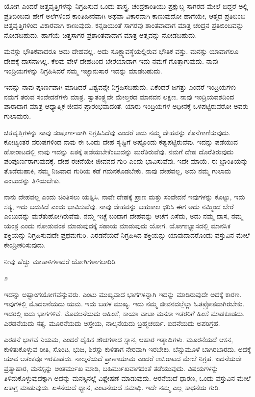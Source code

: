 ಯೋಗ ಎಂದರೆ ಚಿತ್ತವೃತ್ತಿಗಳನ್ನು ನಿಗ್ರಹಿಸುವ ಒಂದು ಶಾಸ್ತ್ರ. ಚಂದ್ರಕಾಂತಿಯು ಪ್ರಕ್ಷುಬ್ಧ ಸಾಗರದ ಮೇಲೆ ಬಿದ್ದರೆ ಅಲ್ಲಿ ಪ್ರತಿಬಿಂಬವು ಹೇಗೆ ಅಲೆಗಳಿಂದ ಕಾಂತಿಹೀನವಾಗಿ ಅಥವಾ ವಿಕಾರವಾಗಿ ಕಾಣುವುದೋ ಹಾಗೆಯೇ, ಆತ್ಮದ ಪ್ರತಿಬಿಂಬ ಚಿತ್ತವೃತ್ತಿಗಳಿಂದ ವಿಕಾರವಾಗಿ ಕಾಣುವುದು. ಕನ್ನಡಿಯಂತೆ ಸಾಗರವು ಶಾಂತವಾದಾಗ ಮಾತ್ರ ಚಂದ್ರನ ಪ್ರತಿಬಿಂಬವನ್ನು ನೋಡಬಹುದು. ಹಾಗೆಯೆ ಚಿತ್ತಸಾಗರ ಪ್ರಶಾಂತವಾದಾಗ ಮಾತ್ರ ಆತ್ಮವನ್ನು ನೋಡಬಹುದು.

\newpage

ಮನಸ್ಸು ಭೌತಿಕವಾದರೂ ಅದು ದೇಹವಲ್ಲ. ಅದು ಸೂಕ್ಷ್ಮಾವಸ್ಥೆಯಲ್ಲಿರುವ ಭೌತಿಕ ವಸ್ತು. ಮನಸ್ಸು ಯಾವಾಗಲೂ ದೇಹಕ್ಕೆ ದಾಸನಾಗಿಲ್ಲ. ಕೆಲವು ವೇಳೆ ದೇಹದಿಂದ ಬೇರೆಯಾದಾಗ ಇದು ನಮಗೆ ಗೊತ್ತಾಗುವುದು. ನಾವು ಇಂದ್ರಿಯಗಳನ್ನು ನಿಗ್ರಹಿಸಿದರೆ ನಮ್ಮ ಇಚ್ಛಾನುಸಾರ ಇದನ್ನು ಮಾಡಬಹುದು.

ಇದನ್ನು ನಾವು ಪೂರ್ಣವಾಗಿ ಮಾಡಿದರೆ ವಿಶ್ವವನ್ನೇ ನಿಗ್ರಹಿಸಬಹುದು. ಏಕೆಂದರೆ ಜಗತ್ತು ಎಂದರೆ ಇಂದ್ರಿಯಗಳು ನಮಗೆ ತರುವ ಸಂವೇದನೆಗಳು ಮಾತ್ರ. ಸ್ವಾತಂತ್ರ್ಯವೇ ಮೇಲ್ತರದ ಮಾನವನ ಲಕ್ಷಣ. ನಾವು ಇಂದ್ರಿಯವಶದಿಂದ ಪಾರಾದಾಗ ಮಾತ್ರ ಆಧ್ಯಾತ್ಮಿಕ ಜೀವನ ಪ್ರಾರಂಭವಾದಂತೆ. ಯಾರು ಇಂದ್ರಿಯಗಳ ಅಧೀನಕ್ಕೆ ಒಳಪಟ್ಟಿರುವರೋ ಅವರು ಗುಲಾಮರು.

ಚಿತ್ತವೃತ್ತಿಗಳನ್ನು ನಾವು ಸಂಪೂರ್ಣವಾಗಿ ನಿಗ್ರಹಿಸಿದೆವು ಎಂದರೆ ಅದು ನಮ್ಮ ದೇಹವನ್ನು ಕೊನೆಗಾಣಿಸುವುದು. ಕೋಟ್ಯಂತರ ವರುಷಗಳಿಂದ ನಾವು ಈ ಒಂದು ದೇಹ ಸೃಷ್ಟಿಗೆ ಅಷ್ಟೊಂದು ಕಷ್ಟಪಟ್ಟಿರುವೆವು. ಇದನ್ನು ಪಡೆಯುವ ಹೋರಾಟದಲ್ಲಿ ನಾವು ಇದನ್ನು ಏತಕ್ಕೆ ಪಡೆಯಬೇಕೆಂಬುದನ್ನು ಮರೆತಿರುವೆವು. ನಮಗೆ ದೇಹ ದೊರೆತಿರುವುದು ಪರಿಪೂರ್ಣರಾಗುವುದಕ್ಕೆ. ದೇಹ ರಚನೆಯೇ ಜೀವನದ ಗುರಿ ಎಂದು ಭಾವಿಸುವೆವು. ಇದೇ ಮಾಯೆ. ಈ ಭ್ರಾಂತಿಯನ್ನು ತೊಡೆದುಹಾಕಿ, ನಮ್ಮ ನಿಜವಾದ ಗುರಿಯ ಕಡೆ ಗಮನಕೊಡಬೇಕು. ನಾವು ದೇಹವಲ್ಲ, ಅದು ನಮ್ಮ ಗುಲಾಮ ಎಂಬುದನ್ನು ತಿಳಿಯಬೇಕು.

ನಾನು ದೇಹವಲ್ಲ ಎಂದು ಚಿಂತಿಸಲು ಯತ್ನಿಸಿ. ನಾವೇ ದೇಹಕ್ಕೆ ಪ್ರಾಣ ಮತ್ತು ಸಂವೇದನೆ ಇವುಗಳನ್ನು ಕೊಟ್ಟು, ಇದು ಸತ್ಯ, ಇದು ಬದುಕಿದೆ ಎಂದು ಭಾವಿಸುವೆವು. ನಾವು ದೇಹವನ್ನು ಬಹುಕಾಲ ಧರಿಸಿ ಈಗ ಅದು ನಮ್ಮಿಂದ ಬೇರೆ ಎಂಬುದನ್ನು ಮರೆತುಹೋಗಿರುವೆವು. ನಮ್ಮ ಇಚ್ಛೆ ಬಂದಾಗ ದೇಹವನ್ನು ಆಚೆಗೆ ಎಸೆದು, ಅದು ನಮ್ಮ ದಾಸ, ನಮ್ಮ ಯಂತ್ರ ಎಂದು ನೋಡುವಂತೆ ಮಾಡುವುದಕ್ಕೆ ಸಹಾಯ ಮಾಡುವುದು ಯೋಗ. ಯೋಗಾಭ್ಯಾಸದಲ್ಲಿ ಮಾನಸಿಕ ಶಕ್ತಿಯನ್ನು ನಿಗ್ರಹಿಸುವುದೇ ಪ್ರಥಮಗುರಿ. ಎರಡನೆಯದೆ ನಿಗ್ರಹಿಸಿದ ಶಕ್ತಿಯನ್ನು ಯಾವುದಾದರೊಂದು ವಸ್ತುವಿನ ಮೇಲೆ ಕೇಂದ್ರೀಕರಿಸುವುದು.

ನೀವು ಹೆಚ್ಚು ಮಾತಾಳಿಗಳಾದರೆ ಯೋಗಿಗಳಾಗಲಾರಿರಿ.

\begin{center}
೨
\end{center}

ಇದನ್ನು ಅಷ್ಟಾಂಗಯೋಗವೆನ್ನುವರು. ಎಂಟು ಮುಖ್ಯವಾದ ಭಾಗಗಳನ್ನಾಗಿ ಇದನ್ನು ಮಾಡಿರುವುದೇ ಅದಕ್ಕೆ ಕಾರಣ. ಇವುಗಳಲ್ಲಿ ಮೊದಲನೆಯದು ಯಮ. ಇದು ಬಹಳ ಮುಖ್ಯ. ಇದು ನಮ್ಮ ಜೀವನದಲ್ಲೆಲ್ಲಾ ಓತಪ್ರೋತವಾಗಿರಬೇಕು. ಇದರಲ್ಲಿ ಐದು ಭಾಗಗಳಿವೆ. ಮೊದಲನೆಯದು ಅಹಿಂಸೆ, ಕಾಯಾ ವಾಚಾ ಮನಸಾ ಇತರರಿಗೆ ಹಿಂಸೆ ಮಾಡಕೂಡದು. ಎರಡನೆಯದು ಸತ್ಯ. ಮೂರನೆಯದು ಅಸ್ತೇಯ, ನಾಲ್ಕನೆಯದು ಬ್ರಹ್ಮಚರ್ಯ. ಐದನೆಯದು ಅಪರಿಗ್ರಹ.

ಎರಡನೆ ಭಾಗವೆ ನಿಯಮ, ಎಂದರೆ ದೈಹಿಕ ಶೌಚಗಳಾದ ಸ್ನಾನ, ಆಹಾರ ಇತ್ಯಾದಿಗಳು. ಮೂರನೆಯದೆ ಆಸನ, ಕುಳಿತುಕೊಳ್ಳುವ ರೀತಿ, ಸೊಂಟ, ಭುಜ, ಶಿರಸ್ಸು ಕುಳಿತಾಗ ನೇರವಾಗಿ ಇರಬೇಕು. ಬೆನ್ನುಮೂಳೆ ಬಾಗಿರಬಾರದು. ಅದಕ್ಕೆ ಯಾವ ಆತಂಕವೂ ಇರಕೂಡದು. ನಾಲ್ಕನೆಯದೆ ಪ್ರಾಣಾಯಾಮ ಎಂದರೆ ಉಸಿರಾಟದ ಮೇಲೆ ನಿಗ್ರಹ. ಐದನೆಯದೇ ಪ್ರತ್ಯಾಹಾರ, ಮನಸ್ಸನ್ನು ಅಂತರ್ಮುಖ ಮಾಡಿ, ಬಹಿರ್ಮುಖವಾಗದಂತೆ ತಡೆಯುವುದು. ವಿಷಯಗಳನ್ನು ತಿಳಿದುಕೊಳ್ಳುವುದಕ್ಕಾಗಿ ಅದನ್ನು ಮನಸ್ಸಿನಲ್ಲೆ ವಿಶ್ಲೇಷಣೆ ಮಾಡುವುದು. ಆರನೆಯದೆ ಧಾರಣ, ಒಂದು ವಸ್ತುವಿನ ಮೇಲೆ ಏಕಾಗ್ರ ಮಾಡುವುದು. ಏಳನೆಯದೆ ಧ್ಯಾನ, ಎಂಟನೆಯದೆ ಸಮಾಧಿ. ಇದೇ ನಮ್ಮ ಎಲ್ಲ ಸಾಧನೆಯ ಗುರಿ.

